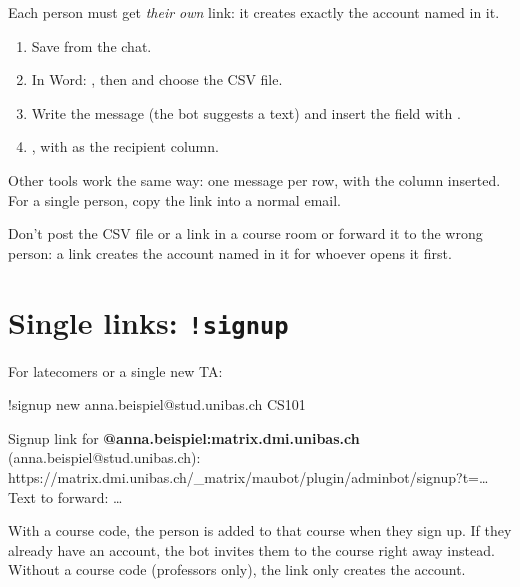 Each person must get \emph{their own} link: it creates exactly the account named in it.

\begin{enumerate}
  \item Save  from the chat.
  \item In Word:  \then {} \then{}
        , then  \then {} and choose the CSV file.
  \item Write the message (the bot suggests a text) and insert the field  with
        .
  \item {} \then {}, with 
        as the recipient column.
\end{enumerate}

Other tools work the same way: one message per row, with the  column inserted.
For a single person, copy the link into a normal email.

\begin{warning}
Don't post the CSV file or a link in a course room or forward it to the wrong person: a link
creates the account named in it for whoever opens it first.
\end{warning}

\section{Single links: \texttt{!signup}}

For latecomers or a single new TA:

\begin{you}
!signup new anna.beispiel@stud.unibas.ch CS101
\end{you}
\begin{botreply}
Signup link for \textbf{@anna.beispiel:matrix.dmi.unibas.ch} (anna.beispiel@stud.unibas.ch):\\
https://matrix.dmi.unibas.ch/\_matrix/maubot/plugin/adminbot/signup?t=\dots\\[4pt]
Text to forward: \dots
\end{botreply}

With a course code, the person is added to that course when they sign up. If they already
have an account, the bot invites them to the course right away instead. Without a course
code (professors only), the link only creates the account.

